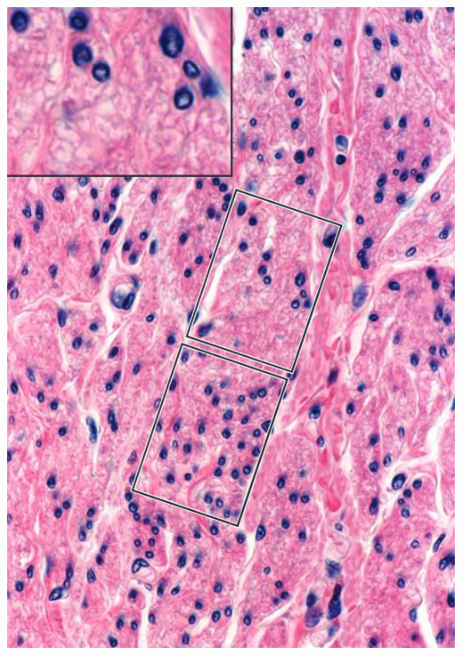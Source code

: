 \begin{itemize}
\begin{center}
    \includegraphics[scale=0.25]{images/week-1-rp14.png}
  \end{center}
\end{itemize}